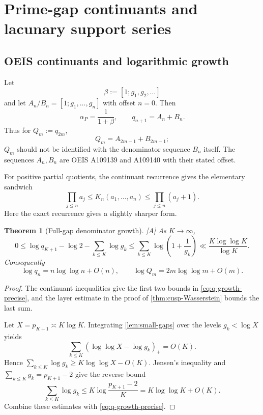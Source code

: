 \documentclass[11pt]{article}
\newtheorem{theorem}{Theorem}[section]
\theoremstyle{definition}
\theoremstyle{remark}
\newcommand{\status}[1]{\textnormal{\textcolor{accent}{\footnotesize[#1]}}}
\begin{document}
\section{Prime-gap continuants and lacunary support series}

\subsection{OEIS continuants and logarithmic growth}

Let
\[
 \beta:=[1;g_1,g_2,\ldots]
\]
and let $A_n/B_n=[1;g_1,\ldots,g_n]$ with offset $n=0$.  Then
\begin{equation}\label{eq:OEIS-CF-dictionary}
 \alpha_P=\frac1{1+\beta},\qquad q_{n+1}=A_n+B_n.
\end{equation}
Thus for $Q_m:=q_{2m}$,
\begin{equation}\label{eq:Q-OEIS}
 Q_m=A_{2m-1}+B_{2m-1};
\end{equation}
$Q_m$ should not be identified with the denominator sequence $B_n$ itself.  The
sequences $A_n,B_n$ are OEIS A109139 and A109140 with their stated offset.

For positive partial quotients, the continuant recurrence gives the elementary sandwich
\[
 \prod_{j\le n}a_j\le K_n(a_1,\ldots,a_n)
 \le\prod_{j\le n}(a_j+1).
\]
Here the exact recurrence gives a slightly sharper form.

\begin{theorem}[Full-gap denominator growth]\label{thm:q-growth}
\status{A}
As $K\to\infty$,
\begin{equation}\label{eq:q-growth-precise}
 0\le
 \log q_{K+1}-\log2-\sum_{k\le K}\log g_k
 \le\sum_{k\le K}\log\left(1+\frac1{g_k}\right)
 \ll\frac{K\log\log K}{\log K}.
\end{equation}
Consequently
\begin{equation}\label{eq:q-growth}
 \log q_n=n\log\log n+O(n),
 \qquad
 \log Q_m=2m\log\log m+O(m).
\end{equation}
\end{theorem}

\begin{proof}
The continuant inequalities give the first two bounds in
\eqref{eq:q-growth-precise}, and the layer estimate in the proof of
\cref{thm:cusp-Wasserstein} bounds the last sum.

Let $X=p_{K+1}\asymp K\log K$.  Integrating \cref{lem:small-gaps} over the levels
$g_k<\log X$ yields
\[
 \sum_{k\le K}(\log\log X-\log g_k)_+=O(K).
\]
Hence $\sum_{k\le K}\log g_k\ge K\log\log X-O(K)$.  Jensen's inequality and
$\sum_{k\le K}g_k=p_{K+1}-2$ give the reverse bound
\[
 \sum_{k\le K}\log g_k
 \le K\log\frac{p_{K+1}-2}{K}
 =K\log\log K+O(K).
\]
Combine these estimates with \eqref{eq:q-growth-precise}.
\end{proof}
\end{document}
